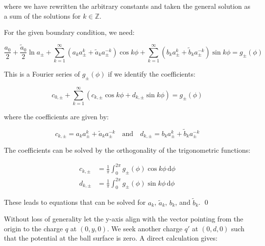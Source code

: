 \documentclass[12pt]{article}
\begin{document}
where we have rewritten the arbitrary constants and taken the general solution as a sum of the solutions for $k \in \mathbb{Z}$.

For the given boundary condition, we need:

\begin{equation}
    \frac{a_{0}}{2} + \frac{\tilde{a}_{0}}{2} \ln{a_{\pm}} + \sum_{k = 1}^{\infty} \left( a_{k} a_{\pm}^{k} + \tilde{a}_{k} a_{\pm}^{-k} \right) \cos{k \phi} + \sum_{k = 1}^{\infty} \left( b_{k} a_{\pm}^{k} + \tilde{b}_{k} a_{\pm}^{-k} \right) \sin{k \phi} = g_{\pm}(\phi)
\end{equation}

This is a Fourier series of $g_{\pm}(\phi)$ if we identify the coefficients:

\begin{equation}
    c_{0, \pm} + \sum_{k = 1}^{\infty} \left( c_{k, \pm} \cos{k \phi} + d_{k, \pm} \sin{k \phi} \right) = g_{\pm}(\phi)
\end{equation}

where the coefficients are given by:

\begin{equation}
    c_{k, \pm} = a_{k} a_{\pm}^{k} + \tilde{a}_{k} a_{\pm}^{-k} \quad \text{and} \quad d_{k, \pm} = b_{k} a_{\pm}^{k} + \tilde{b}_{k} a_{\pm}^{-k}
\end{equation}

The coefficients can be solved by the orthogonality of the trigonometric functions:

\begin{equation}
\begin{split}
    c_{k, \pm} &= \frac{1}{\pi} \int_{0}^{2 \pi} g_{\pm}(\phi) \cos{k \phi} \, \mathrm{d} \phi \\
    d_{k, \pm} &= \frac{1}{\pi} \int_{0}^{2 \pi} g_{\pm}(\phi) \sin{k \phi} \, \mathrm{d} \phi
\end{split}
\end{equation}

These leads to equations that can be solved for $a_{k}$, $\tilde{a}_{k}$, $b_{k}$, and $\tilde{b}_{k}$.
\qed



Without loss of generality let the y-axis align with the vector pointing from the origin to the charge $q$ at $(0, y, 0)$. We seek another charge $q'$ at $(0, d, 0)$ such that the potential at the ball surface is zero. A direct calculation gives:
\end{document}
